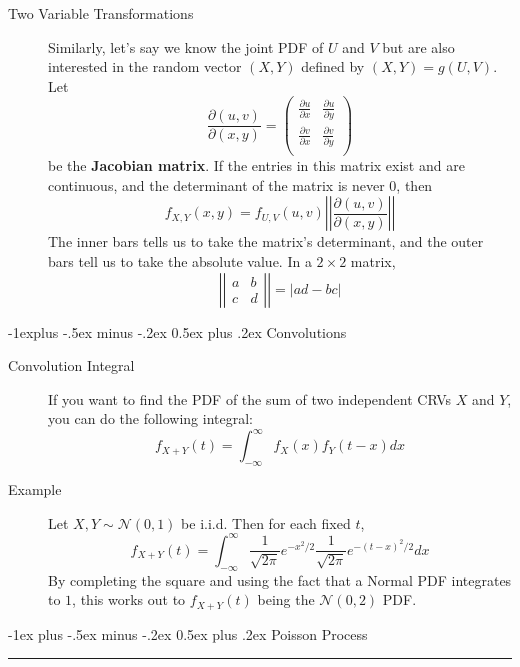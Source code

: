 \documentclass[10pt,landscape]{article}
\makeatletter
\newcommand{\N}{\mathcal{N}}
\renewcommand{\section}{\@startsection{section}{1}{0mm}%
                                {-1ex plus -.5ex minus -.2ex}%
                                {0.5ex plus .2ex}%
                                {\normalfont\large\bfseries}}
\renewcommand{\subsection}{\@startsection{subsection}{2}{0mm}%
                                {-1explus -.5ex minus -.2ex}%
                                {0.5ex plus .2ex}%
                                {\normalfont\normalsize\bfseries}}
\makeatother
\begin{document}
\begin{multicols*}{3}
\begin{description}
     \item[Two Variable Transformations] Similarly, let's say we know the joint PDF of $U$ and $V$ but are also interested in the random vector $(X, Y)$ defined by $(X, Y) = g(U, V)$. Let
       $$  \frac{\partial (u,v)}{\partial (x,y)}  = \begin{pmatrix}
              \frac{\partial u}{\partial x} &  \frac{\partial u}{\partial y} \\
           \frac{\partial v}{\partial x} & \frac{\partial v}{\partial y}   \\
        \end{pmatrix}$$
     be the \textbf{Jacobian matrix}. If the entries in this matrix exist and are continuous, and the determinant of the matrix is never $0$, then
     \[f_{X,Y}(x, y) = f_{U,V}(u,v) \left|\left|   \frac{\partial (u,v)}{\partial (x,y)}\right| \right| \]
   The inner bars tells us to take the matrix's determinant, and the outer bars tell us to take the absolute value.  In a $2 \times 2$ matrix,
     \[ \left| \left|
     \begin{array}{ccc}
         a & b \\
         c & d
     \end{array}
     \right| \right| = |ad - bc|\]

\end{description}

\label{convolutions}
\subsection{Convolutions}
\begin{description}
    \item[Convolution Integral] If you want to find the PDF of the sum of two independent CRVs $X$ and $Y$, you can do the following integral:
        \[f_{X+Y}(t)=\int_{-\infty}^\infty f_X(x)f_Y(t-x)dx\]
    \item[Example] Let $X,Y \sim \N(0,1)$ be i.i.d. Then for each fixed $t$,\[f_{X+Y}(t)=\int_{-\infty}^\infty \frac{1}{\sqrt{2\pi}}e^{-x^2/2} \frac{1}{\sqrt{2\pi}}e^{-(t-x)^2/2} dx\]
By completing the square and using the fact that a Normal PDF integrates to $1$, this works out to $f_{X+Y}(t)$ being the $\N(0,2)$ PDF.
\end{description}

\section{Poisson Process}\smallskip \hrule height 2pt \smallskip


\end{multicols*}
\end{document}
